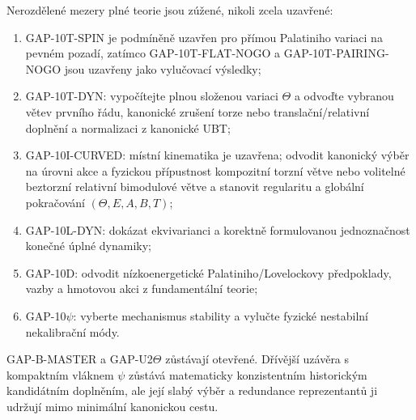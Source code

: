 Nerozdělené mezery plné teorie jsou zúžené, nikoli zcela uzavřené:
\begin{enumerate}
 \item GAP-10T-SPIN je podmíněně uzavřen pro přímou Palatiniho variaci na
       pevném pozadí, zatímco GAP-10T-FLAT-NOGO a
       GAP-10T-PAIRING-NOGO jsou uzavřeny jako vylučovací výsledky;
 \item GAP-10T-DYN: vypočítejte plnou složenou variaci $\Theta$ a odvoďte
       vybranou větev prvního řádu, kanonické zrušení torze nebo
       translační/relativní doplnění a normalizaci z kanonické UBT;
 \item GAP-10I-CURVED: místní kinematika je uzavřena; odvodit kanonický
       výběr na úrovni akce a fyzickou přípustnost kompozitní torzní větve
       nebo volitelné beztorzní relativní bimodulové větve a stanovit
       regularitu a globální pokračování
       $(\Theta,E,A,B,T)$;
 \item GAP-10L-DYN: dokázat ekvivarianci a korektně formulovanou jednoznačnost
       konečné úplné dynamiky;
 \item GAP-10D: odvodit nízkoenergetické Palatiniho/Lovelockovy předpoklady,
       vazby a hmotovou akci z fundamentální teorie;
 \item GAP-10$\psi$: vyberte mechanismus stability a vylučte fyzické
       nestabilní nekalibrační módy.
\end{enumerate}
GAP-B-MASTER a GAP-U2$\Theta$ zůstávají otevřené. Dřívější uzávěra s
kompaktním vláknem $\psi$ zůstává matematicky konzistentním historickým
kandidátním doplněním, ale její slabý výběr a redundance reprezentantů ji
udržují mimo minimální kanonickou cestu.
